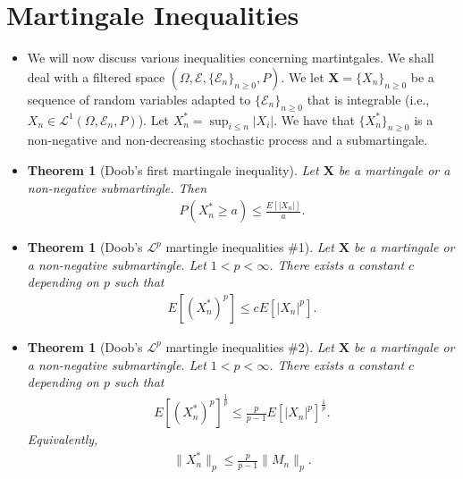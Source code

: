 \documentclass[10pt]{article}
\newtheorem{theorem}[lemma]{Theorem}
\numberwithin{lemma}{section}
\newcommand{\ve}[1]{\mathbf{#1}}
\newcommand{\mcal}[1]{\mathcal{#1}}
\begin{document}
\section{Martingale Inequalities}

\begin{itemize}  
  \item We will now discuss various inequalities concerning martintgales. We shall deal with a filtered space $(\Omega, \mcal{E}, \{ \mcal{E}_n \}_{n \geq 0}, P)$. We let $\ve{X} = \{ X_n \}_{n \geq 0}$ be a sequence of random variables adapted to $\{ \mcal{E}_n \}_{n \geq 0}$ that is integrable (i.e., $X_n \in \mcal{L}^1(\Omega, \mcal{E}_n, P)$). Let $X^*_n = \sup_{i\leq n} |X_i|$. We have that $\{ X^*_n \}_{n \geq 0}$ is a non-negative and non-decreasing stochastic process and a submartingale.
  
  \item \begin{theorem}[Doob's first martingale inequality]
    Let $\ve{X}$ be a martingale or a non-negative submartingle. Then
    \begin{align*}
      P(X^*_n \geq a) \leq \frac{E[|X_n|]}{a}.
    \end{align*}
  \end{theorem}

  \item \begin{theorem}[Doob's $\mcal{L}^p$ martingle inequalities \#1] 
    Let $\ve{X}$ be a martingale or a non-negative submartingle. Let $1 < p < \infty$. There exists a constant $c$ depending on $p$ such that
    \begin{align*}
      E[(X^*_n)^p] \leq c E[|X_n|^p].
    \end{align*}
  \end{theorem}

  \item \begin{theorem}[Doob's $\mcal{L}^p$ martingle inequalities \#2] 
    Let $\ve{X}$ be a martingale or a non-negative submartingle. Let $1 < p < \infty$. There exists a constant $c$ depending on $p$ such that
    \begin{align*}
      E[(X^*_n)^p]^{\frac{1}{p}} \leq \frac{p}{p-1} E[|X_n|^p]^{\frac{1}{p}}.
    \end{align*}
    Equivalently,
    \begin{align*}
      \|X^*_n\|_p \leq \frac{p}{p-1} \| M_n \|_p.
    \end{align*}
  \end{theorem}


\end{itemize}
\end{document}
